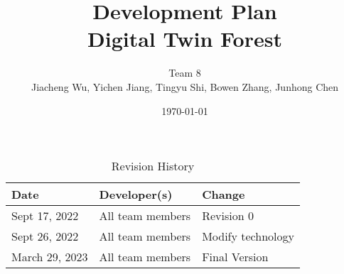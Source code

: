 \documentclass{article}
\title{Development Plan\\ Digital Twin Forest}
\author{Team 8\\Jiacheng Wu, Yichen Jiang, Tingyu Shi, Bowen Zhang, Junhong Chen}
\date{\today}
\begin{document}
 
\maketitle

\begin{table}[hp]
\centering
\caption{Revision History} \label{TblRevisionHistory}
\begin{tabularx}{\textwidth}{XXX}
\toprule
\textbf{Date} & \textbf{Developer(s)} & \textbf{Change}\\
\midrule
Sept 17, 2022 & All team members & Revision 0\\
\hline
Sept 26, 2022 & All team members & Modify technology\\
\hline
March 29, 2023 & All team members & Final Version\\
\bottomrule
\end{tabularx}
\end{table}
\end{document}
